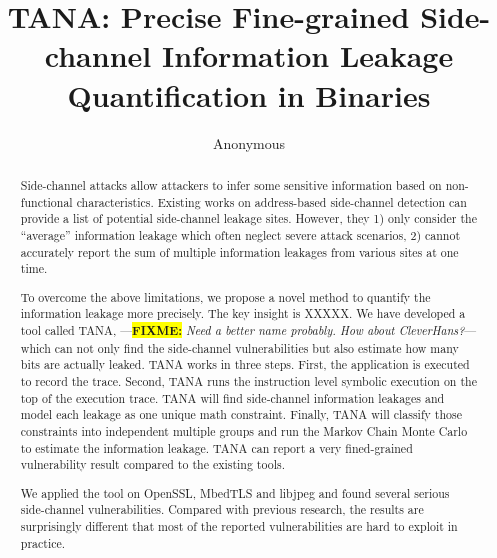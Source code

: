 \documentclass[conference]{IEEEtran}
\newcommand{\highlight}[1]{\colorbox{yellow}{\textbf{#1}}}
\newcommand{\fixme}[1]{\highlight{FIXME:} \emph{#1}}
\newcommand{\tool}{TANA}
\begin{document}
\title{\tool{}: Precise Fine-grained Side-channel Information Leakage Quantification in Binaries}
\author{Anonymous}

\maketitle

\begin{abstract}
    Side-channel attacks allow attackers to infer some sensitive 
    information based on non-functional characteristics. 
    Existing works on address-based side-channel detection 
    can provide a list of potential side-channel leakage sites. However, they 
    1) only consider the ``average'' information leakage 
    which often neglect severe attack scenarios,
    2) cannot accurately report
    the sum of multiple information leakages from various sites at one time.
       
    
    To overcome the above limitations, we propose a novel method
    to quantify the information leakage more precisely.  
    The key insight is XXXXX.
    We have developed a tool called \tool{},
        ---\fixme{Need a better name probably. How about CleverHans?}---
which can not only 
    find the side-channel vulnerabilities but also estimate how many bits are actually leaked. 
    \tool{} works in three steps. First, the application is executed to record the 
    trace. Second, \tool{} runs the instruction level symbolic execution on the top of the 
    execution trace. \tool{} will find side-channel information leakages and model each leakage 
    as one unique math constraint. Finally, \tool{} will classify those constraints into 
    independent multiple groups and run the Markov Chain Monte Carlo to estimate the 
    information leakage. \tool{} can report a very fined-grained vulnerability result 
    compared to the existing tools.
    
    We applied the tool on OpenSSL, MbedTLS and libjpeg and found several serious side-channel 
    vulnerabilities. Compared with previous research, the results are surprisingly different 
    that most of the reported vulnerabilities are hard to exploit in practice. 

\end{abstract}

\IEEEpeerreviewmaketitle
{}














\end{document}
